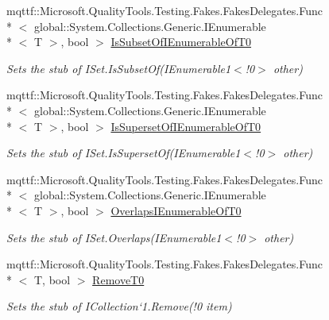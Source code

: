 \begin{DoxyCompactItemize}
mqttf\-::\-Microsoft.\-Quality\-Tools.\-Testing.\-Fakes.\-Fakes\-Delegates.\-Func\\*
$<$ global\-::\-System.\-Collections.\-Generic.\-I\-Enumerable\\*
$<$ T $>$, bool $>$ \hyperlink{class_system_1_1_collections_1_1_generic_1_1_fakes_1_1_stub_i_set_3_01_t_01_4_aa061794468da98b069f6344e2accb2e8}{Is\-Subset\-Of\-I\-Enumerable\-Of\-T0}
\begin{DoxyCompactList}\small\item\em Sets the stub of I\-Set{.\-Is\-Subset\-Of(I\-Enumerable}1$<$!0$>$ other)\end{DoxyCompactList}\item 
mqttf\-::\-Microsoft.\-Quality\-Tools.\-Testing.\-Fakes.\-Fakes\-Delegates.\-Func\\*
$<$ global\-::\-System.\-Collections.\-Generic.\-I\-Enumerable\\*
$<$ T $>$, bool $>$ \hyperlink{class_system_1_1_collections_1_1_generic_1_1_fakes_1_1_stub_i_set_3_01_t_01_4_aad4813553da403bf3a2547c47b0dc82c}{Is\-Superset\-Of\-I\-Enumerable\-Of\-T0}
\begin{DoxyCompactList}\small\item\em Sets the stub of I\-Set{.\-Is\-Superset\-Of(I\-Enumerable}1$<$!0$>$ other)\end{DoxyCompactList}\item 
mqttf\-::\-Microsoft.\-Quality\-Tools.\-Testing.\-Fakes.\-Fakes\-Delegates.\-Func\\*
$<$ global\-::\-System.\-Collections.\-Generic.\-I\-Enumerable\\*
$<$ T $>$, bool $>$ \hyperlink{class_system_1_1_collections_1_1_generic_1_1_fakes_1_1_stub_i_set_3_01_t_01_4_a64082d499e9df2f9ad05257a3b5d2536}{Overlaps\-I\-Enumerable\-Of\-T0}
\begin{DoxyCompactList}\small\item\em Sets the stub of I\-Set{.\-Overlaps(I\-Enumerable}1$<$!0$>$ other)\end{DoxyCompactList}\item 
mqttf\-::\-Microsoft.\-Quality\-Tools.\-Testing.\-Fakes.\-Fakes\-Delegates.\-Func\\*
$<$ T, bool $>$ \hyperlink{class_system_1_1_collections_1_1_generic_1_1_fakes_1_1_stub_i_set_3_01_t_01_4_a68dad22dc2fc683b216cee8cbef4983d}{Remove\-T0}
\begin{DoxyCompactList}\small\item\em Sets the stub of I\-Collection`1.Remove(!0 item)\end{DoxyCompactList}\item 

\end{DoxyCompactItemize}
